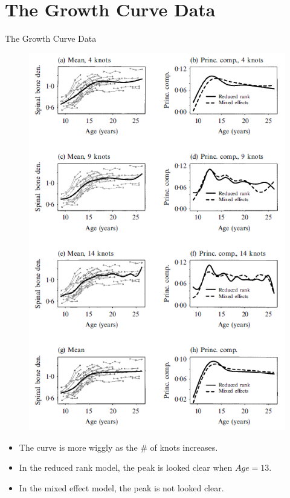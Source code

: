 \documentclass{beamer}
\begin{document}
\section{The Growth Curve Data}
\begin{frame}{The Growth Curve Data}
	\begin{multicols}{2}
		\begin{figure}[h] %
			\begin{center}
				\includegraphics[width=1\linewidth]{img/3.png}
			\end{center}
			\label{fig:long}
			\label{fig:onecol}
		\end{figure}	
		\begin{itemize}
			\item {
				The curve is more wiggly as the \# of knots increases.
			}
			\item {
				In the reduced rank model, the peak is looked clear when $Age=13$.
			}
			\item {
				In the mixed effect model, the peak is not looked clear.
			}
		\end{itemize}
	\end{multicols}
\end{frame}
\end{document}
